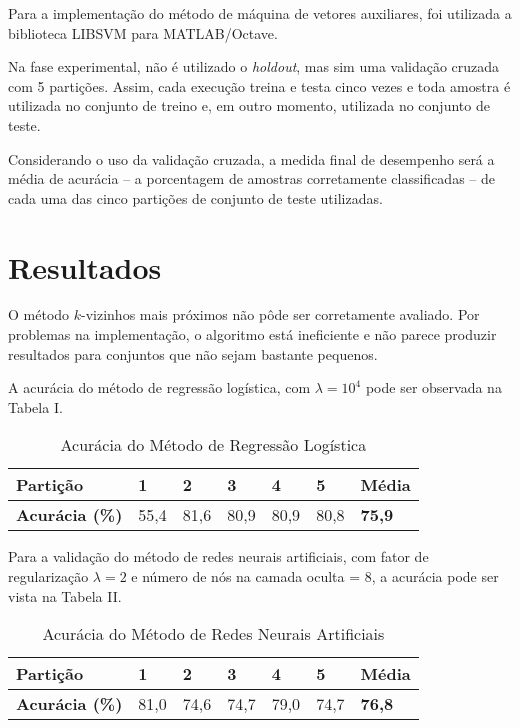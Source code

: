 \documentclass[10pt, conference, compsocconf]{IEEEtran}
\begin{document}
Para a implementação do método de máquina de vetores auxiliares, foi utilizada a biblioteca LIBSVM para MATLAB/Octave.

Na fase experimental, não é utilizado o \textit{holdout}, mas sim uma validação cruzada com 5 partições. Assim, cada execução treina e testa cinco vezes e toda amostra é utilizada no conjunto de treino e, em outro momento, utilizada no conjunto de teste.

Considerando o uso da validação cruzada, a medida final de desempenho será a média de acurácia -- a porcentagem de amostras corretamente classificadas -- de cada uma das cinco partições de conjunto de teste utilizadas.

\section{Resultados}

O método $k$-vizinhos mais próximos não pôde ser corretamente avaliado. Por problemas na implementação, o algoritmo está ineficiente e não parece produzir resultados para conjuntos que não sejam bastante pequenos.

A acurácia do método de regressão logística, com $\lambda = 10^{4}$ pode ser observada na Tabela I. 

\begin{table}[t]
\centering
\caption{Acurácia do Método de Regressão Logística}
\label{rl}
\begin{tabular}{l|l|l|l|l|l|l}
\hline\hline
\textbf{Partição} & 1    & 2    & 3    & 4    & 5    & \textbf{Média} \\ \hline
\textbf{Acurácia (\%)}                 & 55,4 & 81,6 & 80,9 & 80,9 & 80,8 & \textbf{75,9}  \\ \hline
\hline
\end{tabular}
\end{table}

Para a validação do método de redes neurais artificiais, com fator de regularização $\lambda = 2$ e número de nós na camada oculta = 8, a acurácia pode ser vista na Tabela II.

\begin{table}[t]
\centering
\caption{Acurácia do Método de Redes Neurais Artificiais}
\label{ann}
\begin{tabular}{l|l|l|l|l|l|l}
\hline\hline
\textbf{Partição} & 1    & 2    & 3    & 4    & 5    & \textbf{Média} \\ \hline
\textbf{Acurácia (\%)} & 81,0 & 74,6 & 74,7 & 79,0 & 74,7 & \textbf{76,8}  \\ \hline
\hline
\end{tabular}
\end{table}
\end{document}
